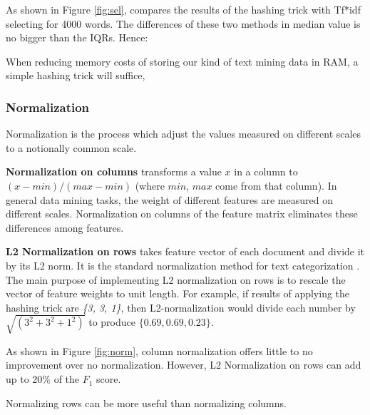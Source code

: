 \documentclass{sig-alternate-05-2015}
\theoremstyle{break}
\begin{document}
As shown in Figure \ref{fig:sel}, compares the results of the hashing trick with
Tf*idf selecting for 4000 words. The differences of these two methods in median value is no bigger than the IQRs.  Hence:
\begin{lesson}
When reducing memory costs of storing our kind of text mining data in RAM,
a simple hashing trick will suffice,
\end{lesson}



\subsubsection{Normalization}

Normalization is the process which adjust the values measured on different scales to a notionally common scale.

\textbf{Normalization on columns} transforms a  value $x$ in a column to $(x - \mathit{min})/(\mathit{max} - \mathit{min})$ (where $\mathit{min}$, $\mathit{max}$ come
from that column).
 In general data mining tasks, the weight of different features are measured on different scales. Normalization on columns of the feature matrix eliminates these differences among features. 

\textbf{L2 Normalization on rows} takes feature vector of each document and divide it by its L2 norm. It is the standard normalization method for text categorization \cite{frank2006naive}. The main purpose of implementing L2 normalization on rows is to rescale the vector of feature weights to unit length. 
For example, if results of applying the hashing
trick are {\em \{3, 3, 1\}}, then L2-normalization would divide each number by
$\sqrt{(3^2+3^2+1^2)}$ to produce $\{0.69,   0.69, 0.23\}$.
 

 
 

As shown in Figure \ref{fig:norm}, column normalization offers little to no improvement
over no normalization. However, L2 Normalization on rows can add up to 20\% of the $F_1$ score.
\begin{lesson}
Normalizing rows can be more useful than normalizing columns.
\end{lesson}
\end{document}
